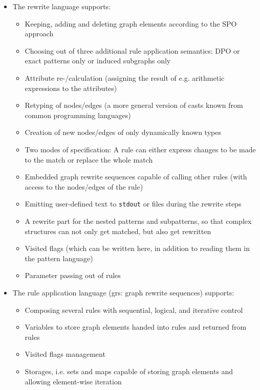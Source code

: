\begin{itemize}
  \item The rewrite language supports:
  \begin{itemize}
    \item Keeping, adding and deleting graph elements according to the SPO approach
	\item Choosing out of three additional rule application semantics: DPO or exact patterns only or induced subgraphs only
    \item Attribute re-/calculation (assigning the result of e.g. arithmetic expressions to the attributes)
    \item Retyping of nodes/edges (a more general version of casts known from common programming languages)
    \item Creation of new nodes/edges of only dynamically known types
    \item Two modes of specification: A rule can either express changes to be made to the match or replace the whole match
    \item Embedded graph rewrite sequences capable of calling other rules (with access to the nodes/edges of the rule)
    \item Emitting user-defined text to \texttt{stdout} or files during the rewrite steps
	\item A rewrite part for the nested patterns and subpatterns, so that complex structures can not only get matched, but also get rewritten
	\item Visited flags (which can be written here, in addition to reading them in the pattern language)
    \item Parameter passing out of rules
  \end{itemize}
  
  \item The rule application language (grs: graph rewrite sequences) supports:
  \begin{itemize}
    \item Composing several rules with sequential, logical, and iterative control
    \item Variables to store graph elements handed into rules and returned from rules
	\item Visited flags management
	\item Storages, i.e. sets and maps capable of storing graph elements and allowing element-wise iteration
  \end{itemize}
\end{itemize}


